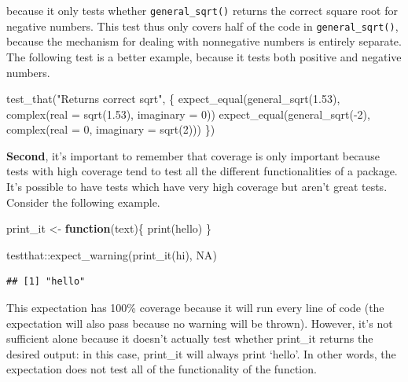 \documentclass[
]{book}
\newenvironment{Shaded}{\begin{snugshade}}{\end{snugshade}}
\newcommand{\AttributeTok}[1]{\textcolor[rgb]{0.77,0.63,0.00}{#1}}
\newcommand{\ConstantTok}[1]{\textcolor[rgb]{0.00,0.00,0.00}{#1}}
\newcommand{\ControlFlowTok}[1]{\textcolor[rgb]{0.13,0.29,0.53}{\textbf{#1}}}
\newcommand{\DecValTok}[1]{\textcolor[rgb]{0.00,0.00,0.81}{#1}}
\newcommand{\FloatTok}[1]{\textcolor[rgb]{0.00,0.00,0.81}{#1}}
\newcommand{\FunctionTok}[1]{\textcolor[rgb]{0.00,0.00,0.00}{#1}}
\newcommand{\NormalTok}[1]{#1}
\newcommand{\OtherTok}[1]{\textcolor[rgb]{0.56,0.35,0.01}{#1}}
\newcommand{\SpecialCharTok}[1]{\textcolor[rgb]{0.00,0.00,0.00}{#1}}
\newcommand{\StringTok}[1]{\textcolor[rgb]{0.31,0.60,0.02}{#1}}
\begin{document}
because it only tests whether \texttt{general\_sqrt()} returns the correct square root for negative numbers. This test thus only covers half of the code in \texttt{general\_sqrt()}, because the mechanism for dealing with nonnegative numbers is entirely separate. The following test is a better example, because it tests both positive and negative numbers.

\begin{Shaded}
\begin{Highlighting}[]
\FunctionTok{test\_that}\NormalTok{(}\StringTok{"Returns correct sqrt"}\NormalTok{, \{}
  \FunctionTok{expect\_equal}\NormalTok{(}\FunctionTok{general\_sqrt}\NormalTok{(}\FloatTok{1.53}\NormalTok{), }\FunctionTok{complex}\NormalTok{(}\AttributeTok{real =} \FunctionTok{sqrt}\NormalTok{(}\FloatTok{1.53}\NormalTok{), }\AttributeTok{imaginary =} \DecValTok{0}\NormalTok{))}
  \FunctionTok{expect\_equal}\NormalTok{(}\FunctionTok{general\_sqrt}\NormalTok{(}\SpecialCharTok{{-}}\DecValTok{2}\NormalTok{), }\FunctionTok{complex}\NormalTok{(}\AttributeTok{real =} \DecValTok{0}\NormalTok{, }\AttributeTok{imaginary =} \FunctionTok{sqrt}\NormalTok{(}\DecValTok{2}\NormalTok{)))}
\NormalTok{\})}
\end{Highlighting}
\end{Shaded}

\textbf{Second}, it's important to remember that coverage is only important because tests with high coverage tend to test all the different functionalities of a package. It's possible to have tests which have very high coverage but aren't great tests. Consider the following example.

\begin{Shaded}
\begin{Highlighting}[]
\NormalTok{print\_it }\OtherTok{\textless{}{-}} \ControlFlowTok{function}\NormalTok{(text)\{}
  \FunctionTok{print}\NormalTok{(}\StringTok{\textquotesingle{}hello\textquotesingle{}}\NormalTok{)}
\NormalTok{\}}

\NormalTok{testthat}\SpecialCharTok{::}\FunctionTok{expect\_warning}\NormalTok{(}\FunctionTok{print\_it}\NormalTok{(}\StringTok{\textquotesingle{}hi\textquotesingle{}}\NormalTok{), }\ConstantTok{NA}\NormalTok{)}
\end{Highlighting}
\end{Shaded}

\begin{verbatim}
## [1] "hello"
\end{verbatim}

This expectation has 100\% coverage because it will run every line of code (the expectation will also pass because no warning will be thrown). However, it's not sufficient alone because it doesn't actually test whether print\_it returns the desired output: in this case, print\_it will always print `hello'. In other words, the expectation does not test all of the functionality of the function.
\end{document}
